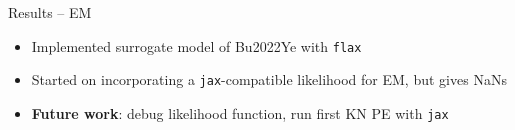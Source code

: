 \documentclass[usenames,dvipsnames,t]{beamer}
\begin{document}
\begin{frame}{Results -- EM}
  \def\x{4mm}


  \begin{itemize}
    \item Implemented surrogate model of Bu2022Ye with \texttt{flax}~\cite{flax2020github}
    
    \vspace{\x}

    \item Started on incorporating a \texttt{jax}-compatible likelihood for EM, but gives NaNs
    

    
    \vspace{\x}

    \item \textbf{Future work}: debug likelihood function, run first KN PE with \texttt{jax}
  \end{itemize}

\end{frame}






    
    
    

    
\end{document}
